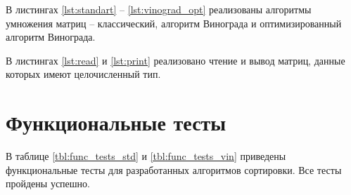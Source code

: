 В листингах \ref{lst:standart} -- \ref{lst:vinograd_opt} реализованы алгоритмы умножения матриц -- классический, алгоритм Винограда и оптимизированный алгоритм Винограда.

В листингах \ref{lst:read} и \ref{lst:print} реализовано чтение и вывод матриц, данные которых имеют целочисленный тип.

\clearpage


\clearpage


\clearpage


\clearpage



\clearpage



\clearpage

\section{Функциональные тесты}

В таблице \ref{tbl:func_tests_std} и \ref{tbl:func_tests_vin} приведены функциональные тесты для разработанных алгоритмов сортировки. Все тесты пройдены успешно.

